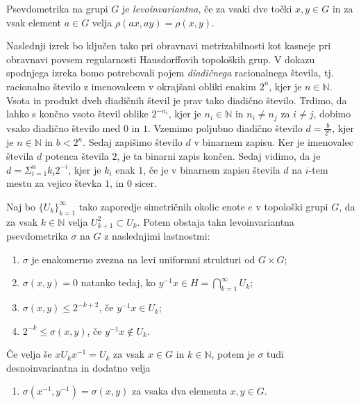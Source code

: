 \documentclass[mat1]{fmfdelo}
\newcommand{\N}{\mathbb N}
\begin{document}
\begin{definicija}
Psevdometrika na grupi $G$ je \emph{levoinvariantna}, če za vsaki dve točki $x, y \in G$ in za vsak element $a \in G$ velja $\rho(ax, ay) = \rho(x, y)$.
\end{definicija}

Naslednji izrek bo ključen tako pri obravnavi metrizabilnosti kot kasneje pri obravnavi povsem regularnosti Hausdorffovih topoloških grup.
V dokazu spodnjega izreka bomo potrebovali pojem \emph{diadičnega} racionalnega števila, tj. racionalno število z imenovalcem v okrajšani obliki enakim $2^n$, kjer je $n \in \N$. Vsota in produkt dveh diadičnih števil je prav tako diadično število. Trdimo, da lahko s končno vsoto števil oblike $2^{-n_i}$, kjer je $n_i \in \N$ in $n_i \neq n_j$ za $i \neq j$, dobimo vsako diadično število med $0$ in $1$.
Vzemimo poljubno diadično število $d = \frac{b}{2^n}$, kjer je $n \in \N$ in $b < 2^n$. Sedaj zapišimo število $d$ v binarnem zapisu. Ker je imenovalec števila $d$ potenca števila $2$, je ta binarni zapis končen. Sedaj vidimo, da je $d = \Sigma_{i=1}^n k_i2^{-i}$, kjer je $k_i$ enak $1$, če je v binarnem zapisu števila $d$ na $i$-tem mestu za vejico števka $1$, in $0$ sicer. 

\begin{izrek}\label{izr:pseudometrika}
	Naj bo $\lbrace U_k \rbrace_{k = 1}^{\infty}$ tako zaporedje simetričnih okolic enote $e$ v topološki grupi $G$, da za vsak $k \in \N$ velja $U_{k+1}^2 \subset U_k$. Potem obstaja taka levoinvariantna psevdometrika $\sigma$ na $G$ z naslednjimi lastnostmi:
	\begin{enumerate}
		\item $\sigma$ je enakomerno zvezna na levi uniformni strukturi od $G \times G$;\label{last:psevdo1}
		\item $\sigma (x, y) = 0$ natanko tedaj, ko $y^{-1}x \in H = \bigcap_{k=1}^{\infty} U_k$;\label{last:psevdo2}
		\item $\sigma (x, y) \leq 2^{-k+2}$, če $y^{-1}x \in U_k$;\label{last:psevdo3}
		\item $2^{-k} \leq \sigma (x, y)$, če $y^{-1}x \notin U_k$.\label{last:psevdo4}
	\end{enumerate}
	
	Če velja še $x U_k x^{-1} = U_k$ za vsak $x \in G$ in $k \in \N$, potem je $\sigma$ tudi desnoinvariantna in dodatno velja
	\begin{enumerate}[resume]
		\item $\sigma (x^{-1}, y^{-1}) = \sigma (x, y)$ za vsaka dva elementa $x, y \in G$.\label{last:psevdo5}
	\end{enumerate}
\end{izrek}
\end{document}
